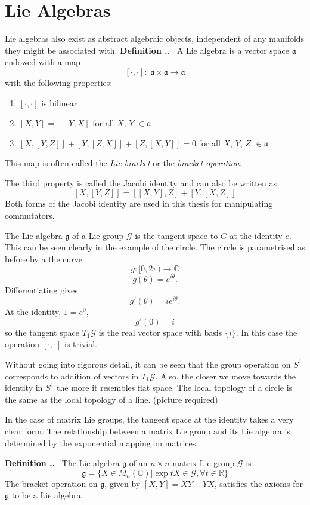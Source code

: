 \documentclass[honours]{UNSWthesis}
\newcommand{\R}{\mathbb{R}}
\newcommand{\C}{\mathbb{C}}
\newcommand{\G}{\mathcal{G}}
\newcommand{\g}{\mathfrak{g}}
\newcommand{\1}{\mathbf{e}_{1}}
\newcommand{\2}{\mathbf{e}_{3}}
\newcommand{\3}{\mathbf{e}_{3}}
\newcounter{Item}[section]
\newenvironment{Definition}{\medskip
                            \refstepcounter{Item}
                            \noindent
                           {\bf Definition \thesection.\theItem.}\ }
                           {\medskip}
\begin{document}
\section{Lie Algebras}
Lie algebras also exist as abstract algebraic objects, independent of any manifolds they might be associated with.
\begin{Definition}\label{Lie Algebra}
A Lie algebra is a vector space $\mathfrak{a}$ endowed with a map
\[ [\cdotp,\cdotp]:\; \mathfrak{a} \times \mathfrak{a} \longrightarrow \mathfrak{a} \]
with the following properties:
\begin{enumerate}
 \item $[\cdotp, \cdotp]$ is bilinear
 \item $[X,Y]=-[Y,X]$ for all $X$, $Y$ $\in \mathfrak{a}$
 \item $[X,[Y,Z]]+[Y,[Z,X]]+[Z,[X,Y]]=0$ for all $X$, $Y$, $Z$ $\in \mathfrak{a}$
\end{enumerate}
This map is often called the \emph{Lie bracket} or the \emph{bracket operation}.

The third property is called the Jacobi identity and can also be written as
\[
[X,[Y,Z]]=[[X,Y],Z]+[Y,[X,Z]]
\]
Both forms of the Jacobi identity are used in this thesis for manipulating commutators.
\end{Definition}


The Lie algebra $\g$ of a Lie group $\G$ is the tangent space to $G$ at the identity $e$. This can be seen clearly in 
the example of the circle. The circle is parametrised as before by a the curve
\[ g: [0,2\pi) \longrightarrow \C \]
\[ g(\theta)= e^{i\theta}.\]
Differentiating gives
\[g' (\theta)= ie^{i\theta}.\]
At the identity, $1=e^{0}$,
\[ g' (0) = i \]
so the tangent space $T_{1}\G$ is the real vector space with basis $\{i\}$. 
In this case the operation $[\cdotp, \cdotp]$ is trivial.

Without going into rigorous detail, it can be seen that the group operation on $S^{1}$ corresponds to addition of 
vectors in $T_{1}\G$. Also, the closer we move towards the identity in $S^{1}$ the more it resembles flat space. The local topology of a circle is the same as the local topology of a line.
(picture required)

In the case of matrix Lie groups, the tangent space at the identity takes a very clear form. The relationship between a 
matrix Lie group and its Lie algebra is determined by the exponential mapping on matrices. 

\begin{Definition}\label{Lie Algebra of a Matrix Lie Group}
The Lie algebra $\g$ of an $n \times n$ matrix Lie group $\G$ is
\[
\g = \{ X \in M_{n}(\C) \big| \exp{tX} \in \G , \forall t \in \R \}
\]
The bracket operation on $\g$, given by $[X,Y]=XY-YX$, satisfies the axioms for $\g$ to be a Lie algebra. 
\end{Definition}
\end{document}
